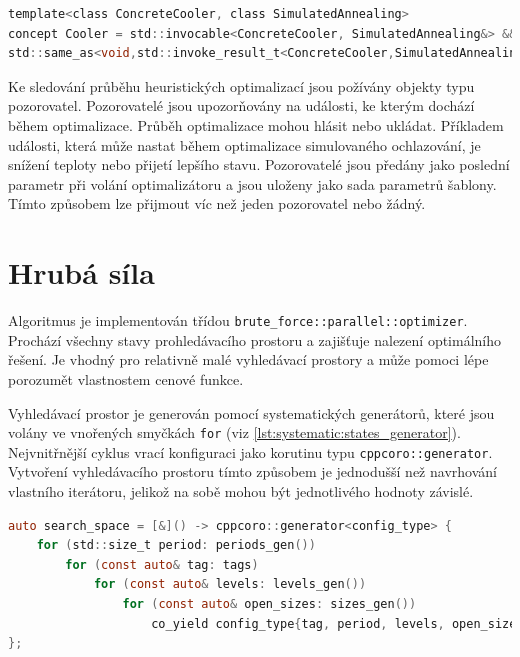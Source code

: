 \begin{lstlisting}[caption={~Koncept pro kontrolu chladícího algoritmu},label={lst:cooling:concept},captionpos=t,abovecaptionskip=-\medskipamount,belowcaptionskip=\medskipamount,language=C]
template<class ConcreteCooler, class SimulatedAnnealing>
concept Cooler = std::invocable<ConcreteCooler, SimulatedAnnealing&> &&
std::same_as<void,std::invoke_result_t<ConcreteCooler,SimulatedAnnealing&>>;
\end{lstlisting}


Ke sledování průběhu heuristických optimalizací jsou požívány objekty typu pozorovatel.
Pozorovatelé jsou upozorňovány na události, ke kterým dochází během optimalizace.
Průběh optimalizace mohou hlásit nebo ukládat.
Příkladem události, která může nastat během optimalizace simulovaného ochlazování, je snížení teploty nebo přijetí lepšího stavu.
Pozorovatelé jsou předány jako poslední parametr při volání optimalizátoru a jsou uloženy jako sada parametrů šablony.
Tímto způsobem lze přijmout víc než jeden pozorovatel nebo žádný.


\section{Hrubá síla}
Algoritmus je implementován třídou \texttt{brute\_force::parallel::optimizer}.
Prochází všechny stavy prohledávacího prostoru a zajišťuje nalezení optimálního řešení.
Je vhodný pro relativně malé vyhledávací prostory a může pomoci lépe porozumět vlastnostem cenové funkce.

Vyhledávací prostor je generován pomocí systematických generátorů, které jsou volány ve vnořených smyčkách \texttt{for} (viz \ref{lst:systematic:states_generator}).
Nejvnitřnější cyklus vrací konfiguraci jako korutinu typu \texttt{cppcoro::generator}.
Vytvoření vyhledávacího prostoru tímto způsobem je jednodušší než navrhování vlastního iterátoru, jelikož na sobě mohou být jednotlivého hodnoty závislé.

\begin{lstlisting}[caption={~Ukázka generování systematického stavového prostoru},label={lst:systematic:states_generator},captionpos=t,abovecaptionskip=-\medskipamount,belowcaptionskip=\medskipamount,language=C]
auto search_space = [&]() -> cppcoro::generator<config_type> {
    for (std::size_t period: periods_gen())
        for (const auto& tag: tags)
            for (const auto& levels: levels_gen())
                for (const auto& open_sizes: sizes_gen())
                    co_yield config_type{tag, period, levels, open_sizes};
};
\end{lstlisting}

